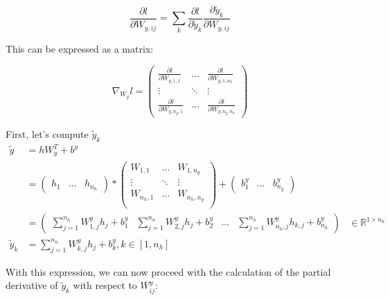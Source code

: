 \[
    \frac{\partial l}{\partial W_{y,ij}} = \sum_{k}^{} \frac{\partial l}{\partial \tilde{y}_k} \frac{\partial \tilde{y}_k}{\partial W_{y,ij}}
\]

This can be expressed as a matrix:

\[
    \nabla_{W_y} l = \begin{pmatrix}
        \frac{\partial l}{\partial W_{y, 1,1}}   & \dots  & \frac{\partial l}{\partial W_{y, 1,n_h}}    \\
        \vdots                                   & \ddots & \vdots                                      \\
        \frac{\partial l}{\partial W_{y, n_y,1}} & \dots  & \frac{\partial l}{\partial W_{y, n_y, n_h}}
    \end{pmatrix}
\]

First, let's compute $ \tilde{y}_k $
\begin{align*}
    \tilde{y}   & = h W_y^T + b^y                                                                                                        \\
                & = \begin{pmatrix}
        h_{1} & \dots & h_{n_h}
    \end{pmatrix} * \begin{pmatrix}
        W_{1, 1}   & \dots  & W_{1, n_y}   \\
        \vdots     & \ddots & \vdots       \\
        W_{n_h, 1} & \dots  & W_{n_h, n_y} \\
    \end{pmatrix} + \begin{pmatrix}
        b^y_1 & \dots & b^y_{n_y}
    \end{pmatrix}                                 \\
                & = \begin{pmatrix}
        \sum_{j=1}^{n_h} W^y_{1,j} h_{j} + b^y_1 & \sum_{j=1}^{n_h} W^y_{2,j} h_{j} + b^y_2 & \dots & \sum_{j=1}^{n_h} W^y_{n_h,j} h_{k,j} + b^y_{n_h}
    \end{pmatrix}                                                           & \in \mathbb{R}^{1 \times n_h} \\
    \tilde{y}_k & = \sum_{j=1}^{n_h} W^y_{k,j} h_{j} + b_k^y, k \in [1, n_h]
\end{align*}

With this expression, we can now proceed with the calculation of the partial derivative of \( \tilde{y}_k \) with respect to \( W^y_{ij} \):

